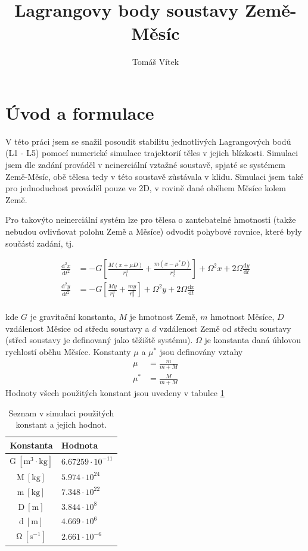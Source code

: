 \documentclass[a4paper,11pt]{article}
\begin{document}
\title{Lagrangovy body soustavy Země-Měsíc}
\author{Tomáš Vítek}

\maketitle
\section{Úvod a formulace}
V této práci jsem se snažil posoudit stabilitu jednotlivých Lagrangových bodů (L1 - L5) pomocí
numerické simulace trajektorií těles v jejich blízkosti. Simulaci jsem dle zadání prováděl
v neinerciální vztažné soustavě, spjaté se systémem Země-Měsíc, obě tělesa tedy v této soustavě 
zůstávala v klidu. Simulaci jsem také pro jednoduchost prováděl pouze ve 2D, v rovině dané oběhem Měsíce kolem Země.

Pro takovýto neinerciální systém lze pro tělesa o zantebatelné hmotnosti (takže nebudou ovlivňovat polohu Země a Měsíce)
odvodit pohybové rovnice, které byly součástí zadání, tj.

\begin{align*}
    \frac{\mathrm{d}^2 x}{\mathrm{d}t^2} &= -G \left[ \frac{M (x + \mu D)}{r_1^3} + \frac{m (x - \mu^* D)}{r_2^3} \right] + \Omega^2 x + 2 \Omega \frac{\mathrm{d} y}{\mathrm{d}t} \\
    \frac{\mathrm{d}^2 y}{\mathrm{d}t^2} &= -G \left[ \frac{M y}{r_1^3} + \frac{m y}{r_2^3} \right] + \Omega^2 y + 2 \Omega \frac{\mathrm{d} x}{\mathrm{d}t} \\
\end{align*}

kde $G$ je gravitační konstanta, $M$ je hmotnost Země, $m$ hmotnost Měsíce, $D$ vzdálenost Měsíce od středu soustavy a $d$ vzdálenost Země od středu
soustavy (střed soustavy je definovaný jako těžiště systému). $\Omega$ je konstanta daná úhlovou rychlostí oběhu Měsíce.
Konstanty $\mu$ a $\mu^*$ jsou definovány vztahy
\begin{align*}
    \mu &= \frac{m}{m + M} \\
    \mu^* &= \frac{M}{m + M}
\end{align*}
Hodnoty všech použitých konstant jsou uvedeny v tabulce \ref{tab:constants}
\begin{table}
    \centering
    \begin{tabular}{c|l}
        \textbf{Konstanta} & \textbf{Hodnota} \\ \hline
        $\mathrm{G \ [m^3 \cdot kg]}$ & $6.67259\cdot 10^{-11}$ \\
        $\mathrm{M \ [kg]}$ & $5.974 \cdot 10^{24}$ \\
        $\mathrm{m \ [kg]}$ & $7.348 \cdot 10^{22}$ \\
        $\mathrm{D \ [m]}$ & $3.844 \cdot 10^{8}$ \\
        $\mathrm{d \ [m]}$ & $4.669 \cdot 10^{6}$ \\
        $\mathrm{\Omega \ [s^{-1}]}$ & $2.661 \cdot 10^{-6}$
    \end{tabular}
    \caption{Seznam v simulaci použitých konstant a jejich hodnot.}
    \label{tab:constants}
\end{table}
\end{document}
